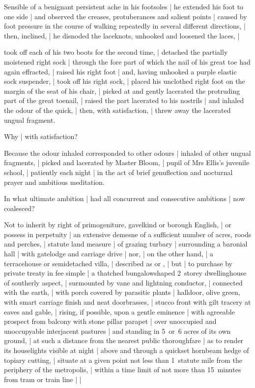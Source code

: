 \Factual
Sensible of a benignant persistent ache in his footsoles |
he extended his foot to one side |
and observed the creases, protuberances and salient points |
caused by foot pressure in the course of walking repeatedly
in several different directions, |
then,
inclined, |
he disnoded the laceknots, unhooked and loosened the laces, |

\Science
took off each of his two boots for the second time, |
detached the partially moistened right sock |
through the fore part of which the nail of his great toe had again effracted, |
raised his right foot |
and,
having unhooked a purple elastic sock suspender, |
took off his right sock, |
placed his unclothed right foot on the margin of the seat of his chair, |
picked at and gently lacerated the protruding part of the great toenail, |
raised the part lacerated to his nostrils |
and inhaled the odour of the quick, |
then,
with satisfaction, |
threw away the lacerated ungual fragment.


Why |
with satisfaction?

\Memories
Because the odour inhaled corresponded to other odours |
inhaled of other ungual fragments, |
picked and lacerated by Master Bloom, |
pupil of Mrs Ellis's juvenile school, |
patiently each night |
in the act of brief genuflection and nocturnal prayer and ambitious meditation.


In what ultimate ambition |
had all concurrent and consecutive ambitions |
now coalesced?

\Factual
Not to inherit by right of primogeniture, gavelkind or borough English, |
or possess in perpetuity |
an extensive demesne of a sufficient number of acres, roods and perches, |
statute land measure
 |
of grazing turbary |
surrounding a baronial hall |
with gatelodge and carriage drive |
nor, |
on the other hand, |
a terracehouse or semidetached villa, |
described as  or , |
but |
to purchase by private treaty in fee simple |
a thatched bungalowshaped 2~storey dwellinghouse of southerly aspect, |
surmounted by vane and lightning conductor, |
connected with the earth, |
with porch covered by parasitic plants
 |
halldoor, olive green,
with smart carriage finish and neat doorbrasses, |
stucco front with gilt tracery at eaves and gable, |
rising, if possible, upon a gentle eminence |
with agreeable prospect from balcony with stone pillar parapet |
over unoccupied and unoccupyable interjacent pastures |
and standing in 5~or~6 acres of its own ground, |
at such a distance from the nearest public thoroughfare |
as to render its houselights visible at night |
above and through a quickset hornbeam hedge of topiary cutting, |
situate at a given point not less than 1~statute mile
from the periphery of the metropolis, |
within a time limit of not more than 15~minutes from tram or train line |
 |

